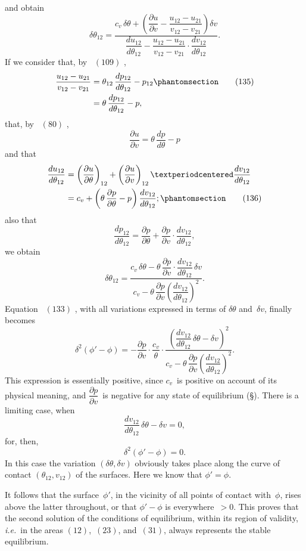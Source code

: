 \documentclass[12pt]{book}[2005/09/16]
\newcommand{\Chg}[2]{#2}
\newcommand{\Add}[1]{\Chg{}{#1}}
\newcommand{\SecRef}[2][§\;]{\hyperref[section:#2.]{{\upshape #1#2}}}
\newcommand{\Tag}[1]{%
  \phantomsection\label{eqn:#1}\tag*{\ensuremath{#1}}%
}
\newcommand{\Eq}[1]{%
  \hyperref[eqn:#1]{\ensuremath{#1}}%
}
\newcommand{\PageSep}[1]{\ignorespaces}
\newcommand{\ie}{\emph{i.e.}}
\newcommand{\dd}{\partial}
\begin{document}
and obtain
\[
\delta \theta_{12}
  = \frac{c_{v}\, \delta \theta + \left(\dfrac{\dd u}{\dd v} - \dfrac{u_{12} - u_{21}}{v_{12} - v_{21}}\right) \delta v}
         {\dfrac{du_{12}}{d\theta_{12}} - \dfrac{u_{12} - u_{21}}{v_{12} - v_{21}} \Add{·} \dfrac{dv_{12}}{d\theta_{12}}}.
\]
If we consider that, by~\Eq{(109)},
\begin{align*}
\frac{u_{12} - u_{21}}{v_{12} - v_{21}}
  &= \theta_{12}\, \frac{dp_{12}}{d\theta_{12}} - p_{12}
\Tag{(135)} \\
  &= \theta\, \frac{dp_{12}}{d\theta_{12}} - p,
\end{align*}
that, by~\Eq{(80)},
\[
\frac{\dd u}{\dd v} = \theta\, \frac{dp}{d\theta} - p
\]
and that
\begin{align*}
\frac{du_{12}}{d\theta_{12}}
  &= \left(\frac{\dd u}{\dd \theta}\right)_{12} + \left(\frac{\dd u}{\dd v}\right)_{12} · \frac{dv_{12}}{d\theta_{12}} \\
  &= c_{v} + \left(\theta\, \frac{\dd p}{\dd \theta} - p\right) \frac{dv_{12}}{d\theta_{12}}\Add{;}
\Tag{(136)}
\end{align*}
also that
\[
\frac{dp_{12}}{d\theta_{12}} = \frac{\dd p}{\dd \theta} + \frac{\dd p}{\dd v} · \frac{dv_{12}}{d\theta_{12}},
\]
we obtain
\[
\delta \theta_{12}
  = \frac{c_{v}\, \delta \theta - \theta\, \dfrac{\dd p}{\dd v} · \dfrac{dv_{12}}{d\theta_{12}}\, \delta v}{c_{v} - \theta\, \dfrac{\dd p}{\dd v} \left(\dfrac{dv_{12}}{d\theta_{12}}\right)^{2}}.
\]
Equation~\Eq{(133)}, with all variations expressed in terms of $\delta \theta$
and~$\delta v$, finally becomes
\[
\delta^{2} (\phi' - \phi)
  = -\frac{\dd p}{\dd v} · \frac{c_{v}}{\theta}
   · \frac{\left(\dfrac{dv_{12}}{d\theta_{12}}\, \delta \theta - \delta v\right)^{2}}{c_{v} - \theta\, \dfrac{\dd p}{\dd v} \left(\dfrac{dv_{12}}{d\theta_{12}}\right)^{2}}.
\]
This expression is essentially positive, since $c_{v}$~is positive
\PageSep{168}
on account of its physical meaning, and $\dfrac{\dd p}{\dd v}$~is negative for
any state of equilibrium (\SecRef{169}). There is a limiting case,
when
\[
\frac{dv_{12}}{d\theta_{12}}\, \delta \theta - \delta v = 0,
\]
for, then,
\[
\delta^{2} (\phi' - \phi) = 0.
\]
In this case the variation $(\delta \theta, \delta v)$ obviously takes place
along the curve of contact $(\theta_{12}, v_{12})$ of the surfaces. Here
we know that $\phi' = \phi$.

It follows that the surface~$\phi'$, in the vicinity of all points
of contact with~$\phi$, rises above the latter throughout, or that
$\phi' - \phi$ is everywhere~$> 0$. This proves that the second
solution of the conditions of equilibrium, within its region
of validity, \ie\ in the areas $(12)$,~$(23)$, and~$(31)$, always represents
the stable equilibrium.
\end{document}

